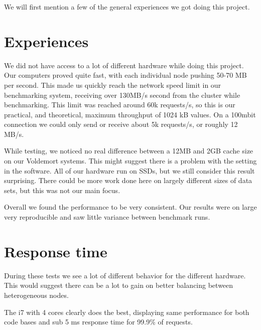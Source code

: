 
We will first mention a few of the general experiences we got doing this project.

\section{Experiences}
We did not have access to a lot of different hardware while doing this project. Our computers proved quite fast, with each individual node pushing 50-70 MB per second. This made us quickly reach the network speed limit in our benchmarking system, receiving over 130MB/s second from the cluster while benchmarking. This limit was reached around 60k requests/s, so this is our practical, and theoretical, maximum throughput of 1024 kB values. On a 100mbit connection we could only send or receive about 5k requests/s, or roughly 12 MB/s. 

While testing, we noticed no real difference between a 12MB and 2GB cache size on our Voldemort systems. This might suggest there is a problem with the setting in the software. All of our hardware run on SSDs, but we still consider this result surprising. There could be more work done here on largely different sizes of data sets, but this was not our main focus.

Overall we found the performance to be very consistent. Our results were on large very reproducible and saw little variance between benchmark runs.

\section{Response time}
During these tests we see a lot of different behavior for the different hardware. This would suggest there can be a lot to gain on better balancing between heterogeneous nodes.


The i7 with 4 cores clearly does the best, displaying same performance for both code bases and sub 5 ms response time for 99.9\% of requests.
